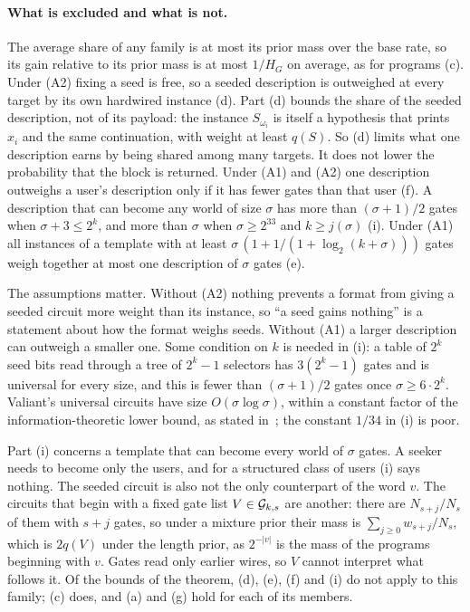 \paragraph{What is excluded and what is not.} The average share of any family is at most its prior mass over
the base rate, so its gain relative to its prior mass is at most $1/H_G$ on average, as for programs (c).
Under (A2) fixing a seed is free, so a seeded description is outweighed at every target by its own hardwired
instance (d). Part (d) bounds the share of the seeded description, not of its payload: the instance
$S_{\omega_i}$ is itself a hypothesis that prints $x_i$ and the same continuation, with weight at least
$q(S)$. So (d) limits what one description earns by being shared among many targets. It does not lower the
probability that the block is returned. Under (A1) and (A2) one description outweighs a user's description
only if it has fewer gates than that user (f). A description that can become any world of size $\sigma$ has
more than $(\sigma+1)/2$ gates when $\sigma+3\le2^k$, and more than $\sigma$ when $\sigma\ge2^{33}$ and
$k\ge j(\sigma)$ (i). Under (A1) all instances of a template with at least
$\sigma\,(1+1/(1+\log_2(k+\sigma)))$ gates weigh together at most one description of $\sigma$ gates (e).

The assumptions matter. Without (A2) nothing prevents a format from giving a seeded circuit more weight than
its instance, so ``a seed gains nothing'' is a statement about how the format weighs seeds. Without (A1) a
larger description can outweigh a smaller one. Some condition on $k$ is needed in (i): a table of $2^k$ seed
bits read through a tree of $2^k-1$ selectors has $3(2^k-1)$ gates and is universal for every size, and this
is fewer than $(\sigma+1)/2$ gates once $\sigma\ge6\cdot2^k$. Valiant's universal circuits have size
$O(\sigma\log\sigma)$, within a constant factor of the information-theoretic lower bound, as stated
in~\cite{bera08}; the constant $1/34$ in (i) is poor.

Part (i) concerns a template that can become every world of $\sigma$ gates. A seeker needs to become only the
users, and for a structured class of users (i) says nothing. The seeded circuit is also not the only
counterpart of the word $v$. The circuits that begin with a fixed gate list $V\in\mathcal G_{k,s}$ are another: there
are $N_{s+j}/N_s$ of them with $s+j$ gates, so under a mixture prior their mass is $\sum_{j\ge0}w_{s+j}/N_s$,
which is $2q(V)$ under the length prior, as $2^{-|v|}$ is the mass of the programs beginning with $v$. Gates
read only earlier wires, so $V$ cannot interpret what follows it. Of the bounds of the theorem, (d), (e), (f)
and (i) do not apply to this family; (c) does, and (a) and (g) hold for each of its members.

